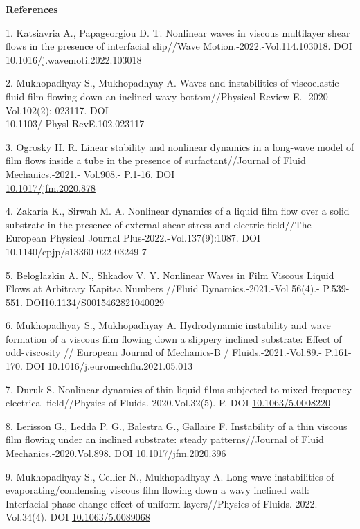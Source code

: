 \begin{center}
{\bfseries References}
\end{center}

\begin{references}
1. Katsiavria A., Papageorgiou D. T. Nonlinear waves in viscous
multilayer shear flows in the presence of interfacial slip//Wave
Motion.-2022.-Vol.114.103018. DOI 10.1016/j.wavemoti.2022.103018

2. Mukhopadhyay S., Mukhopadhyay A. Waves and instabilities of
viscoelastic fluid film flowing down an inclined wavy bottom//Physical
Review E.- 2020-Vol.102(2): 023117.
DOI \\10.1103/ Physl RevE.102.023117

3. Ogrosky H. R. Linear stability and nonlinear dynamics in a long-wave
model of film flows inside a tube in the presence of surfactant//Journal
of Fluid Mechanics.-2021.- Vol.908.- P.1-16. DOI\\
\href{https://doi.org/10.1017/jfm.2020.878}{10.1017/jfm.2020.878}

4. Zakaria K., Sirwah M. A. Nonlinear dynamics of a liquid film flow
over a solid substrate in the presence of external shear stress and
electric field//The European Physical Journal
Plus-2022.-Vol.137(9):1087. DOI 10.1140/epjp/s13360-022-03249-7

5. Beloglazkin A. N., Shkadov V. Y. Nonlinear Waves in Film Viscous
Liquid Flows at Arbitrary Kapitsa Numbers //Fluid Dynamics.-2021.-Vol
56(4).- P.539-551.
DOI\href{http://dx.doi.org/10.1134/S0015462821040029}{10.1134/S0015462821040029}

6. Mukhopadhyay S., Mukhopadhyay A. Hydrodynamic instability and wave
formation of a viscous film flowing down a slippery inclined substrate:
Effect of odd-viscosity // European Journal of
Mechanics-B / Fluids.-2021.-Vol.89.- P.161-170.
DOI 10.1016/j.euromechflu.2021.05.013

7. Duruk S. Nonlinear dynamics of thin liquid films subjected to
mixed-frequency electrical field//Physics of Fluids.-2020.Vol.32(5). P.
DOI \href{http://dx.doi.org/10.1063/5.0008220}{10.1063/5.0008220}

8. Lerisson G., Ledda P. G., Balestra G., Gallaire F. Instability of a
thin viscous film flowing under an inclined substrate: steady
patterns//Journal of Fluid Mechanics.-2020.Vol.898.
DOI \href{http://dx.doi.org/10.1017/jfm.2020.396}{10.1017/jfm.2020.396}

9. Mukhopadhyay S., Cellier N., Mukhopadhyay A. Long-wave instabilities
of evaporating/condensing viscous film flowing down a wavy inclined
wall: Interfacial phase change effect of uniform layers//Physics of
Fluids.-2022.-Vol.34(4). DOI
\href{http://dx.doi.org/10.1063/5.0089068}{10.1063/5.0089068}


\end{references}
